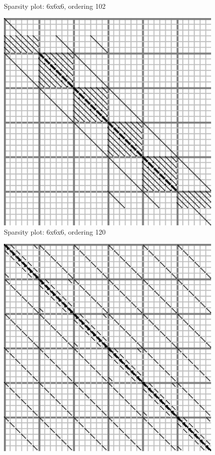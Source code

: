 \documentclass[10pt]{article}
\begin{document}
\begin{multicols}{2}
\begin{center}
\begin{minipage}[t]{.5\textwidth}
\begin{figure}[H]
    \caption{Sparsity plot: 6x6x6, ordering 102 }
\end{figure}
\end{minipage}%
\begin{minipage}[t]{.5\textwidth}%
\begin{figure}[H]
    \centering
    \includegraphics[width=\spwidth]{../img/sparsity/int_small_6x6x6_120.eps}
    \caption{Sparsity plot: 6x6x6, ordering 120 }
\end{figure}
\vspace{\spmgin}
\begin{figure}[H]
    \centering
    \includegraphics[width=\spwidth]{../img/sparsity/int_small_6x6x6_201.eps}

\end{figure}
\end{minipage}
\end{center}
\end{multicols}
\end{document}
